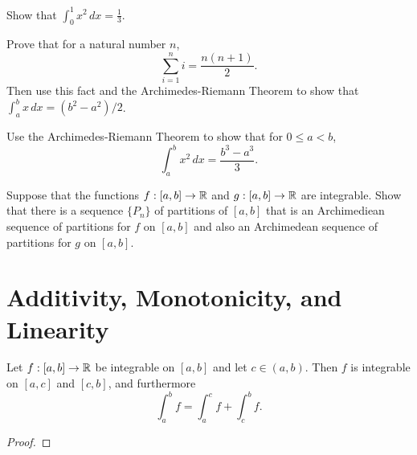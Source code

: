 \documentclass[letterpaper, twoside, 12pt]{book}
\begin{document}
\begin{example}[6.11]
  Show that \(\int_0^1 x^2\,dx=\frac{1}{3}\).
\end{example}
\begin{solution}

\end{solution}


\begin{exercise}[4]
  Prove that for a natural number \(n\),
  \[
    \sum_{i=1}^n i = \frac{n(n+1)}{2}
  .\]
  Then use this fact and the Archimedes-Riemann Theorem to show that
  \(\int_a^b x\,dx=(b^2-a^2)/2\).
\end{exercise}
\begin{solution}

\end{solution}


\begin{exercise}[6b]
  Use the Archimedes-Riemann Theorem to show that for \(0\leq a<b\),
  \[
    \int_a^b x^2\,dx = \frac{b^3-a^3}{3}
  .\]
\end{exercise}
\begin{solution}

\end{solution}


\begin{exercise}[9]
  Suppose that the functions \(f:[a,b]\to\mathbb R\) and
  \(g:[a,b]\to\mathbb R\) are integrable. Show that there is a sequence
  \(\{P_n\}\) of partitions of \([a,b]\) that is an Archimediean sequence
  of partitions for \(f\) on \([a,b]\) and also an Archimedean sequence
  of partitions for \(g\) on \([a,b]\).
\end{exercise}
\begin{solution}

\end{solution}




\section{Additivity, Monotonicity, and Linearity}


\begin{theorem}
  Let \(f:[a,b]\to\mathbb R\) be integrable on \([a,b]\) and let \(c\in(a,b)\).
  Then \(f\) is integrable on \([a,c]\) and \([c,b]\), and furthermore
  \[
    \int_a^b f = \int_a^c f + \int_c^b f
  .\]
\end{theorem}
\begin{proof}

\end{proof}
\end{document}
